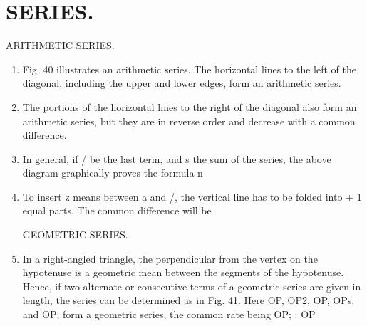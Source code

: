 
\chapter{SERIES.}



ARITHMETIC SERIES.


\begin{enumerate}

\item Fig. 40 illustrates an arithmetic series. The horizontal lines to the left
    of the diagonal, including the upper and lower edges, form an arithmetic
    series.


%
%
%
%
%
%

\item The portions of the horizontal lines to the right of the diagonal also
    form an arithmetic series, but they are in reverse order and decrease with a
    common difference.


\item In general, if / be the last term, and s the sum of the series, the above
    diagram graphically proves the formula n

%

\item To insert z means between a and /, the vertical line has to be folded into
    + 1 equal parts. The common difference will be



GEOMETRIC SERIES.


\item In a right-angled triangle, the perpendicular from the vertex on the
    hypotenuse is a geometric mean between the segments of the hypotenuse.
    Hence, if two alternate or consecutive terms of a geometric series are
    given in length, the series can be determined as in Fig. 41. Here OP,
    OP2, OP, OPs, and OP; form a geometric series, the common rate being OP;
    : OP



\end{enumerate}

